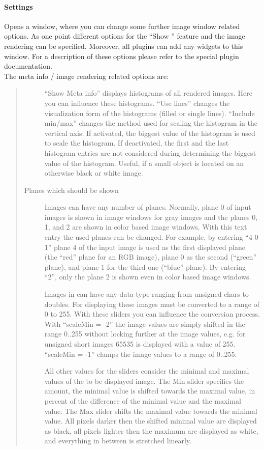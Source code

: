 \paragraph{Settings}
Opens a window, where you can change some further image window
related options. As one point different options for the ``Show
'' feature and the image rendering can be
specified. Moreover, all plugins can add any widgets to this
window. For a description of these options please refer to the
special plugin documentation.\\ The meta info / image rendering
related options are:
\begin{quote}
\begin{description}
\item[] ``Show Meta info'' displays histograms of
  all rendered images. Here you can influence these histograms.
  ``Use lines'' changes the visualization form of the histograms
  (filled or single lines). ``Include min/max'' changes the method
  used for scaling the histogram in the vertical axis. If activated,
  the biggest value of the histogram is used to scale the
  histogram. If deactivated, the first and the last histogram
  entries are not considered during determining the biggest value of
  the histogram. Useful, if a small object is located on an
  otherwise black or white image.
\item[Planes which should be shown] Images can have any number of
  planes. Normally, plane 0 of input images is shown in image
  windows for gray images and the planes 0, 1, and 2 are shown in
  color based image windows. With this text entry the used planes
  can be changed. For example, by entering ``4 0 1'' plane 4 of the
  input image is used as the first displayed plane (the ``red''
  plane for an RGB image), plane 0 as the second (``green'' plane),
  and plane 1 for the third one (``blue'' plane). By entering ``2'',
  only the plane 2 is shown even in color based image windows.
\item[] Images in \icewing{} can have any data
  type ranging from unsigned chars to doubles. For displaying these
  images must be converted to a range of 0 to 255. With these
  sliders you can influence the conversion process. With ``scaleMin
  = -2'' the image values are simply shifted in the range 0..255
  without locking further at the image values, e.g. for unsigned
  short images 65535 is displayed with a value of 255. ``scaleMin
  = -1'' clamps the image values to a range of 0..255.

  All other values for the sliders consider the minimal and maximal
  values of the to be displayed image. The Min slider specifies the
  amount, the minimal value is shifted towards the maximal value, in
  percent of the difference of the minimal value and the maximal
  value. The Max slider shifts the maximal value towards the minimal
  value. All pixels darker then the shifted minimal value are
  displayed as black, all pixels lighter then the maximum are
  displayed as white, and everything in between is stretched
  linearly.
\end{description}
\end{quote}

